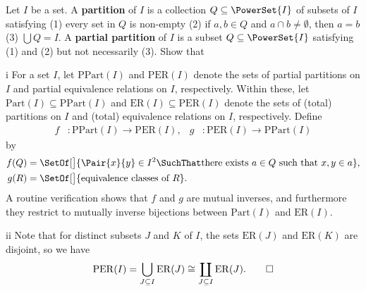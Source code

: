 \begin{exercise}
Let \(I\) be a set.
A \textbf{partition} of \(I\) is a collection \(Q \subseteq \PowerSet{I}\) of subsets of \(I\) satisfying (1) every set in \(Q\) is non-empty (2) if \(a, b \in Q\) and \(a \cap b \neq \emptyset\), then \(a = b\) (3) \(\bigcup Q = I\).
A \textbf{partial partition} of \(I\) is a subset \(Q \subseteq \PowerSet{I}\) satisfying (1) and (2) but not necessarily (3).
Show that
\end{exercise}

\begin{partsolution}{i}
For a set \(I\), let \(\mathrm{PPart}(I)\) and \(\mathrm{PER}(I)\) denote the sets of partial partitions on \(I\) and partial equivalence relations on \(I\), respectively.
Within these, let \(\mathrm{Part}(I) \subseteq \mathrm{PPart}(I)\) and \(\mathrm{ER}(I) \subseteq \mathrm{PER}(I)\) denote the sets of (total) partitions on \(I\) and (total) equivalence relations on \(I\), respectively.
Define
\begin{align*}
f &: \mathrm{PPart}(I) \to \mathrm{PER}(I), &
g &: \mathrm{PER}(I) \to \mathrm{PPart}(I)
\end{align*}
by
\begin{align*}
f(Q) &= \SetOf[\big]{\Pair{x}{y} \in I^2 \SuchThat \text{there exists \(a \in Q\) such that \(x, y \in a\)}}, \\
g(R) &= \SetOf[\big]{\text{equivalence classes of \(R\)}}.
\end{align*}
A routine verification shows that \(f\) and \(g\) are mutual inverses, and furthermore they restrict to mutually inverse bijections between \(\mathrm{Part}(I)\) and \(\mathrm{ER}(I)\).
\end{partsolution}

\begin{partsolution}{ii}
Note that for distinct subsets \(J\) and \(K\) of \(I\), the sets \(\mathrm{ER}(J)\) and \(\mathrm{ER}(K)\) are disjoint, so we have
\begin{equation*}
\mathrm{PER}(I)
= \bigcup_{J \subseteq I} \mathrm{ER}(J)
\cong \coprod_{J \subseteq I} \mathrm{ER}(J).
\qedhere
\end{equation*}
\end{partsolution}